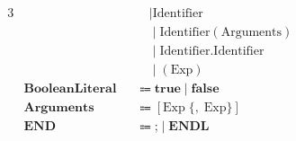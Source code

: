 \documentclass[a4paper,11pt]{article}
\begin{document}
\begin{alignat*}{3}
&                       &&\quad\mid  \text{Identifier} &&\\
&                       &&\quad\mid  \text{Identifier}(\text{Arguments}) &&\\
&                       &&\quad\mid  \text{Identifier}.\text{Identifier} &&\\
&                       &&\quad\mid  (\text{Exp}) &&\\
&\textbf{BooleanLiteral}  &&\Coloneqq  \textbf{true}\mid\textbf{false} &&\\
&\textbf{Arguments}       &&\Coloneqq  [\text{Exp}\;\lbrace,\;\text{Exp}\rbrace] &&\\
&\textbf{END}              &&\Coloneqq  \textbf{;}\mid\textbf{ENDL} &&
\end{alignat*}
\end{document}

